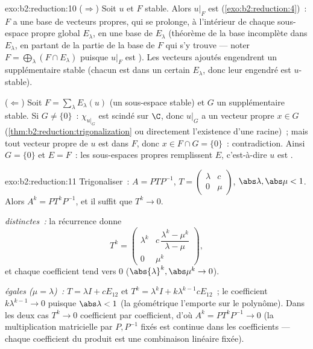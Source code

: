 \begin{solution}{exo:b2:reduction:10}
($\Rightarrow$) Soit $u$  et $F$ stable. Alors $u|_F$
est  (\cref{exo:b2:reduction:4})~: $F$ a une base de
vecteurs propres, qui se prolonge, à l'intérieur de chaque sous-espace
propre global $E_\lambda$, en une base de $E_\lambda$ (théorème de la
base incomplète dans $E_\lambda$, en partant de la partie de la base
de $F$ qui s'y trouve --- noter $F = \bigoplus_\lambda (F \cap
E_\lambda)$ puisque $u|_F$ est ). Les vecteurs ajoutés
engendrent un supplémentaire stable (chacun est dans un certain
$E_\lambda$, donc leur engendré est $u$-stable).

($\Leftarrow$) Soit $F = \sum_\lambda E_\lambda(u)$ (un sous-espace
stable) et $G$ un supplémentaire stable. Si $G \neq \{0\}$~:
$\chi_{u|_G}$ est scindé sur $\C$, donc $u|_G$ a un vecteur propre $x
\in G$ (\cref{thm:b2:reduction:trigonalization} ou directement
l'existence d'une racine)~; mais tout vecteur propre de $u$ est dans
$F$, donc $x \in F \cap G = \{0\}$~: contradiction. Ainsi $G = \{0\}$
et $E = F$~: les sous-espaces propres remplissent $E$, c'est-à-dire
$u$ est .
\end{solution}

\begin{solution}{exo:b2:reduction:11}
Trigonaliser~: $A = PTP^{-1}$, $T = \begin{pmatrix} \lambda & c\\ 0 &
\mu\end{pmatrix}$, $\abs\lambda, \abs\mu < 1$. Alors $A^k =
PT^kP^{-1}$, et il suffit que $T^k \to 0$.

\emph{ distinctes~:} la récurrence donne
\[
T^k = \begin{pmatrix}
\lambda^k & c\,\dfrac{\lambda^k - \mu^k}{\lambda - \mu}\\[4pt]
0 & \mu^k
\end{pmatrix},
\]
et chaque coefficient tend vers $0$ ($\abs{\lambda}^k, \abs\mu^k \to
0$).

\emph{ égales ($\mu = \lambda$)~:} $T = \lambda I +
cE_{12}$ et $T^k = \lambda^k I + k\lambda^{k-1}cE_{12}$~; le
coefficient $k\lambda^{k-1} \to 0$ puisque $\abs\lambda < 1$ (la
géométrique l'emporte sur le polynôme). Dans les deux cas $T^k \to 0$
coefficient par coefficient, d'où $A^k = PT^kP^{-1} \to 0$ (la
multiplication matricielle par $P, P^{-1}$ fixés est continue dans les
coefficients --- chaque coefficient du produit est une combinaison
linéaire fixée).
\end{solution}

